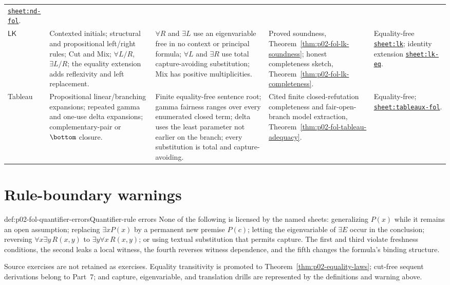 \begin{landscape}
\begin{longtable}{@{}p{.65in}p{1.35in}p{1.95in}p{1.90in}p{1.25in}@{}}
\hyperref[sheet:nd-fol]{\texttt{sheet:nd-fol}}. \\
\(\mathsf{LK}\) & Contexted initials; structural and propositional left/right
rules; Cut and Mix; \(\forall L/R\), \(\exists L/R\); the equality extension
adds reflexivity and left replacement. & \(\forall R\) and \(\exists L\) use
an eigenvariable free in no context or principal formula; \(\forall L\) and
\(\exists R\) use total capture-avoiding substitution; Mix has positive
multiplicities. & Proved soundness,
Theorem~\ref{thm:p02-fol-lk-soundness}; honest completeness sketch,
Theorem~\ref{thm:p02-fol-lk-completeness}. & Equality-free
\hyperref[sheet:lk]{\texttt{sheet:lk}}; identity extension
\hyperref[sheet:lk-eq]{\texttt{sheet:lk-eq}}. \\
Tableau & Propositional linear/branching expansions; repeated gamma and
one-use delta expansions; complementary-pair or \(\bottom\) closure. & Finite
equality-free sentence root; gamma fairness ranges over every enumerated
closed term; delta uses the least parameter not earlier on the branch; every
substitution is total and capture-avoiding. & Cited finite closed-refutation
completeness and fair-open-branch model extraction,
Theorem~\ref{thm:p02-fol-tableau-adequacy}. & Equality-free;
\hyperref[sheet:tableaux-fol]{\texttt{sheet:tableaux-fol}}. \\
\bottomrule
\end{longtable}
\endgroup
\end{landscape}

\section{Rule-boundary warnings}
\label{sec:p02-fol-rule-warnings}

\begin{hbwarning}{def:p02-fol-quantifier-errors}{Quantifier-rule errors}
None of the following is licensed by the named sheets: generalizing \(P(x)\)
while it remains an open assumption; replacing \(\exists xP(x)\) by a
permanent new premise \(P(c)\); letting the eigenvariable of \(\exists E\)
occur in the conclusion; reversing
\(\forall x\exists y\,R(x,y)\) to
\(\exists y\forall x\,R(x,y)\); or using textual substitution that permits
capture.  The first and third violate freshness conditions, the second leaks
a local witness, the fourth reverses witness dependence, and the fifth
changes the formula's binding structure.
\end{hbwarning}

Source exercises are not retained as exercises.  Equality transitivity is
promoted to Theorem~\ref{thm:p02-equality-laws}; cut-free sequent derivations
belong to Part~7; and capture, eigenvariable, and translation drills are
represented by the definitions and warning above.
